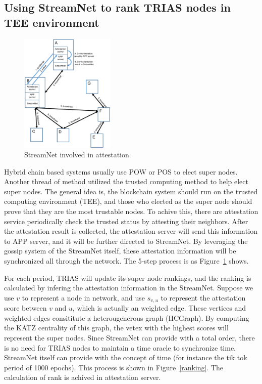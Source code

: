 \subsection{Using StreamNet to rank TRIAS nodes in TEE environment}

\begin{figure}[!ht]
        \begin{center}
                \includegraphics[width=0.40\textwidth]{figures/attestation.pdf}
                \caption{StreamNet involved in attestation.}
                \label{attestation}
        \end{center}
\end{figure}

Hybrid chain based systems usually use POW or POS to elect super nodes. 
Another thread of method utilized the trusted computing method \cite{ruan2017repcloud,ruan2014neuronvisor} to help elect super nodes. 
The general idea is, the blockchain system should run on the trusted computing environment (TEE),
and those who elected as the super node should prove that they are the most trustable nodes.
To achive this, there are attestation service periodically check the trusted status by attesting their neighbors. 
After the attestation result is collected, the attestation server will send this information to APP server, and it will be further directed to StreamNet.
By leveraging the gossip system of the StreamNet itself, these attestation information will be synchronized all through the network. The 5-step process is as Figure~\ref{attestation} shows.

For each period, TRIAS will update its super node rankings, and the ranking is calculated by infering the attestation information in the StreamNet.
Suppose we use $v$ to represent a node in network, and use $s_{v,u}$ to represent the attestation score between $v$ and $u$, which is actually an weighted edge.
These vertices and weighted edges consititute a heterougenerous graph (HCGraph). 
By computing the KATZ centrality of this graph, the vetex with the highest scores will represent the super nodes.
Since StreamNet can provide with a total order, there is no need for TRIAS nodes to maintain a time oracle to synchronize time.
StreamNet itself can provide with the concept of time (for instance the tik tok period of 1000 epochs). 
This process is shown in Figure~\ref{ranking}. The calculation of rank is achived in attestation server.

